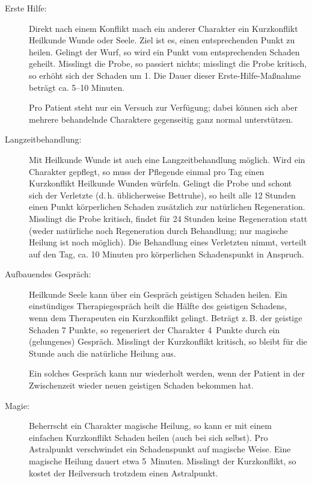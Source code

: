 \begin{description}
  \item[Erste Hilfe:] Direkt nach einem Konflikt mach ein anderer Charakter ein Kurzkonflikt Heilkunde Wunde oder Seele. Ziel ist es, einen entsprechenden Punkt zu heilen. Gelingt der Wurf, so wird ein Punkt vom entsprechenden Schaden geheilt. Misslingt die Probe, so passiert nichts; misslingt die Probe kritisch, so erhöht sich der Schaden um 1. Die Dauer dieser Erste-Hilfe-Maßnahme beträgt ca. 5--10 Minuten.
  
  Pro Patient steht nur ein Versuch zur Verfügung; dabei können sich aber mehrere behandelnde Charaktere gegenseitig ganz normal unterstützen.
  
  \item[Langzeitbehandlung:] Mit Heilkunde Wunde ist auch eine Langzeitbehandlung möglich. Wird ein Charakter gepflegt, so muss der Pflegende einmal pro Tag einen Kurzkonflikt Heilkunde Wunden würfeln. Gelingt die Probe und schont sich der Verletzte (d.\,h. üblicherweise Bettruhe), so heilt alle 12 Stunden einen Punkt körperlichen Schaden zusätzlich zur natürlichen Regeneration. Misslingt die Probe kritisch, findet für 24 Stunden keine Regeneration statt (weder natürliche noch Regeneration durch Behandlung; nur magische Heilung ist noch möglich). Die Behandlung eines Verletzten nimmt, verteilt auf den Tag, ca. 10 Minuten pro körperlichen Schadenspunkt in Anspruch.
  
  \item[Aufbauendes Gespräch:] Heilkunde Seele kann über ein Gespräch geistigen Schaden  heilen. Ein einstündiges Therapiegespräch heilt die Hälfte des geistigen Schadens, wenn dem Therapeuten ein Kurzkonflikt gelingt. Beträgt z.\,B. der geistige Schaden 7 Punkte, so regeneriert der Charakter 4~Punkte durch ein (gelungenes) Gespräch. Misslingt der Kurzkonflikt kritisch, so bleibt für die Stunde auch die natürliche Heilung aus.
  
  Ein solches Gespräch kann nur wiederholt werden, wenn der Patient in der Zwischenzeit wieder neuen geistigen Schaden bekommen hat.

  \item[Magie:] Beherrscht ein Charakter magische Heilung, so kann er mit einem einfachen Kurzkonflikt Schaden heilen (auch bei sich selbst). Pro Astralpunkt verschwindet ein Schadenspunkt auf magische Weise. Eine magische Heilung dauert etwa 5~Minuten. Misslingt der Kurzkonflikt, so kostet der Heilversuch trotzdem einen Astralpunkt.
\end{description}

